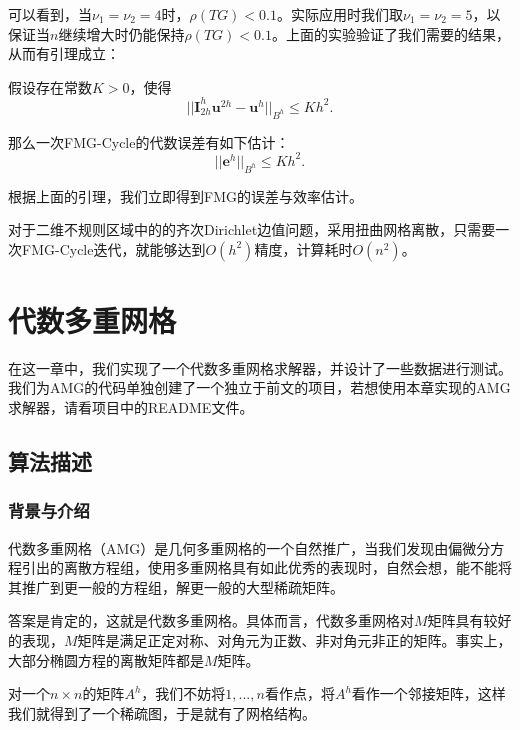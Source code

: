 \documentclass[lang=cn,10pt]{elegantbook}
\begin{document}
可以看到，当$\nu_1=\nu_2=4$时，$\rho(TG)<0.1$。实际应用时我们取$\nu_1=\nu_2=5$，以保证当$n$继续增大时仍能保持$\rho(TG)<0.1$。上面的实验验证了我们需要的结果，从而有引理成立：

\begin{lemma}
  假设存在常数$K>0$，使得
  \begin{equation}
    ||\mathbf{I}_{2h}^h \mathbf{u}^{2h}-\mathbf{u}^{h}||_{B^h}\leq Kh^2.
  \end{equation}

  那么一次FMG-Cycle的代数误差有如下估计：
  \begin{equation}
    ||\mathbf{e}^h||_{B^h}\leq Kh^2.
  \end{equation}
\end{lemma}

根据上面的引理，我们立即得到FMG的误差与效率估计。

\begin{theorem}
  对于二维不规则区域中的的齐次Dirichlet边值问题，采用扭曲网格离散，只需要一次FMG-Cycle迭代，就能够达到$O(h^2)$精度，计算耗时$O(n^2)$。
\end{theorem}

\newpage

\chapter{代数多重网格}

在这一章中，我们实现了一个代数多重网格求解器，并设计了一些数据进行测试。我们为AMG的代码单独创建了一个独立于前文的项目，若想使用本章实现的AMG求解器，请看项目中的README文件。

\section{算法描述}

\subsection{背景与介绍}

代数多重网格（AMG）是几何多重网格的一个自然推广，当我们发现由偏微分方程引出的离散方程组，使用多重网格具有如此优秀的表现时，自然会想，能不能将其推广到更一般的方程组，解更一般的大型稀疏矩阵。

答案是肯定的，这就是代数多重网格。具体而言，代数多重网格对$M$矩阵具有较好的表现，$M$矩阵是满足正定对称、对角元为正数、非对角元非正的矩阵。事实上，大部分椭圆方程的离散矩阵都是$M$矩阵。

对一个$n\times n$的矩阵$A^h$，我们不妨将$1,...,n$看作点，将$A^h$看作一个邻接矩阵，这样我们就得到了一个稀疏图，于是就有了网格结构。
\end{document}
